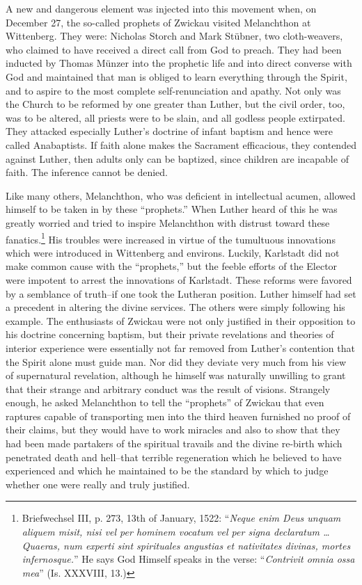 A new and dangerous element was injected into this movement
when, on December 27, the so-called prophets of Zwickau visited
Melanchthon at Wittenberg. They were: Nicholas Storch and Mark
Stübner, two cloth-weavers, who claimed to have received a direct
call from God to preach. They had been inducted by Thomas Münzer into
the prophetic life and into direct converse with God and
maintained that man is obliged to learn everything through the Spirit,
and to aspire to the most complete self-renunciation and apathy. Not
only was the Church to be reformed by one greater than Luther, but
the civil order, too, was to be altered, all priests were to be slain, and
all godless people extirpated. They attacked especially Luther’s doctrine
of infant baptism and hence were called Anabaptists. If faith
alone makes the Sacrament efficacious, they contended against Luther,
then adults only can be baptized, since children are incapable of faith.
The inference cannot be denied.

Like many others, Melanchthon, who was deficient in intellectual
acumen, allowed himself to be taken in by these “prophets.” When
Luther heard of this he was greatly worried and tried to inspire
Melanchthon with distrust toward these fanatics.\footnote
{Briefwechsel III, p. 273, 13th of January, 1522: “\textit{Neque enim Deus unquam aliquem
misit, nisi vel per hominem vocatum vel per signa declaratum \dots Quaeras, num experti
sint spirituales angustias et nativitates divinas, mortes infernosque.}” He says God Himself
speaks in the verse: “\textit{Contrivit omnia ossa mea}” (Is. XXXVIII, 13.)}
His troubles were
increased in virtue of the tumultuous innovations which were introduced
in Wittenberg and environs. Luckily, Karlstadt did not make
common cause with the “prophets,” but the feeble efforts of the
Elector were impotent to arrest the innovations of Karlstadt.
These reforms were favored by a semblance of truth--if one
took the Lutheran position. Luther himself had set a precedent in
altering the divine services. The others were simply following his example.
The enthusiasts of Zwickau were not only justified in their
opposition to his doctrine concerning baptism, but their private revelations
and theories of interior experience were essentially not far
removed from Luther’s contention that the Spirit alone must
guide man. Nor did they deviate very much from his view of supernatural
revelation, although he himself was naturally unwilling to
grant that their strange and arbitrary conduct was the result of
visions. Strangely enough, he asked Melanchthon to tell the “prophets”
of Zwickau that even raptures capable of transporting men
into the third heaven furnished no proof of their claims, but they
would have to work miracles and also to show that they had been
made partakers of the spiritual travails and the divine re-birth which
penetrated death and hell--that terrible regeneration which he believed
to have experienced and which he maintained to be the standard by which
to judge whether one were really and truly justified.

